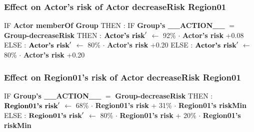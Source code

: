 \documentclass{article}%
\begin{document}
\subsubsection{Effect on Actor's risk of Actor decreaseRisk Region01}%
\label{ssubsec:Effect on Actor's risk of Actor decreaseRisk Region01}%
\begin{flushleft}%
IF %
\textbf{Actor memberOf Group}%
\linebreak%
\hspace*{2em}%
THEN %
: %
IF %
\textbf{Group's \_\_ACTION\_\_}%
$=$%
\textbf{Group{-}decreaseRisk}%
\linebreak%
\hspace*{4em}%
THEN %
: %
$\mbox{\textbf{Actor's risk}} '$%
$\leftarrow$%
92\%%
$\cdot$%
\textbf{Actor's risk}%
+0.08%
\linebreak%
\hspace*{4em}%
ELSE %
: %
$\mbox{\textbf{Actor's risk}} '$%
$\leftarrow$%
80\%%
$\cdot$%
\textbf{Actor's risk}%
+0.20%
\linebreak%
\hspace*{2em}%
ELSE %
: %
$\mbox{\textbf{Actor's risk}} '$%
$\leftarrow$%
80\%%
$\cdot$%
\textbf{Actor's risk}%
+0.20%
\end{flushleft}

%
\subsubsection{Effect on Region01's risk of Actor decreaseRisk Region01}%
\label{ssubsec:Effect on Region01's risk of Actor decreaseRisk Region01}%
\begin{flushleft}%
IF %
\textbf{Group's \_\_ACTION\_\_}%
$=$%
\textbf{Group{-}decreaseRisk}%
\linebreak%
\hspace*{2em}%
THEN %
: %
$\mbox{\textbf{Region01's risk}} '$%
$\leftarrow$%
68\%%
$\cdot$%
\textbf{Region01's risk}%
+%
31\%%
$\cdot$%
\textbf{Region01's riskMin}%
\linebreak%
\hspace*{2em}%
ELSE %
: %
$\mbox{\textbf{Region01's risk}} '$%
$\leftarrow$%
80\%%
$\cdot$%
\textbf{Region01's risk}%
+%
20\%%
$\cdot$%
\textbf{Region01's riskMin}%
\end{flushleft}

%
\end{document}
